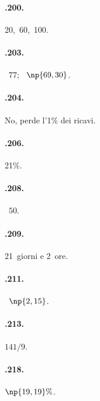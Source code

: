 \begin{multicols}{3}
\paragraph{\thechapter.200.} 20{\textdegree},~60{\textdegree},~100{\textdegree}.

\paragraph{\thechapter.203.} \officialeuro~$77$; \officialeuro~$\np{69,30}$.

\paragraph{\thechapter.204.} No, perde l'1\% dei ricavi.

\paragraph{\thechapter.206.} 21\%.

\paragraph{\thechapter.208.} \officialeuro~$50$.

\paragraph{\thechapter.209.} 21~giorni e 2~ore.

\paragraph{\thechapter.211.} \officialeuro~$\np{2,15}$.

\paragraph{\thechapter.213.} $ 141/9 $.

\paragraph{\thechapter.218.} $\np{19,19}\%$.

\end{multicols}
